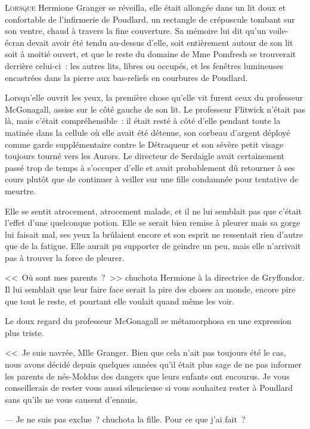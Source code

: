 
\lettrine{L}{orsque} Hermione Granger se réveilla, elle était allongée dans un lit doux et confortable de l'infirmerie de Poudlard, un rectangle de crépuscule tombant sur son ventre, chaud à travers la fine couverture. Sa mémoire lui dit qu'un voile-écran devait avoir été tendu au-dessus d'elle, soit entièrement autour de son lit soit à moitié ouvert, et que le reste du domaine de Mme Pomfresh se trouverait derrière celui-ci~: les autres lits, libres ou occupés, et les fenêtres lumineuses encastrées dans la pierre aux bas-reliefs en courbures de Poudlard.

Lorsqu'elle ouvrit les yeux, la première chose qu'elle vit furent ceux du professeur McGonagall, assise sur le côté gauche de son lit. Le professeur Flitwick n'était pas là, mais c'était compréhensible~: il était resté à côté d'elle pendant toute la matinée dans la cellule où elle avait été détenue, son corbeau d'argent déployé comme garde supplémentaire contre le Détraqueur et son sévère petit visage toujours tourné vers les Aurors. Le directeur de Serdaigle avait certainement passé trop de temps à s'occuper d'elle et avait probablement dû retourner à ses cours plutôt que de continuer à veiller sur une fille condamnée pour tentative de meurtre.

Elle se sentit atrocement, atrocement malade, et il ne lui semblait pas que c'était l'effet d'une quelconque potion. Elle se serait bien remise à pleurer mais sa gorge lui faisait mal, ses yeux la brûlaient encore et son esprit ne ressentait rien d'autre que de la fatigue. Elle aurait pu supporter de geindre un peu, mais elle n'arrivait pas à trouver la force de pleurer.

<<~Où sont mes parents~?~>> chuchota Hermione à la directrice de Gryffondor. Il lui semblait que leur faire face serait la pire des choses au monde, encore pire que tout le reste, et pourtant elle voulait quand même les voir.

Le doux regard du professeur McGonagall se métamorphosa en une expression plus triste.

<<~Je suis navrée, Mlle Granger. Bien que cela n'ait pas toujours été le cas, nous avons décidé depuis quelques années qu'il était plus sage de ne pas informer les parents de nés-Moldus des dangers que leurs enfants ont encourus. Je vous conseillerais de rester vous aussi silencieuse si vous souhaitez rester à Poudlard sans qu'ils ne vous causent d'ennuis.

--- Je ne suis pas exclue~? chuchota la fille. Pour ce que j'ai fait~?

